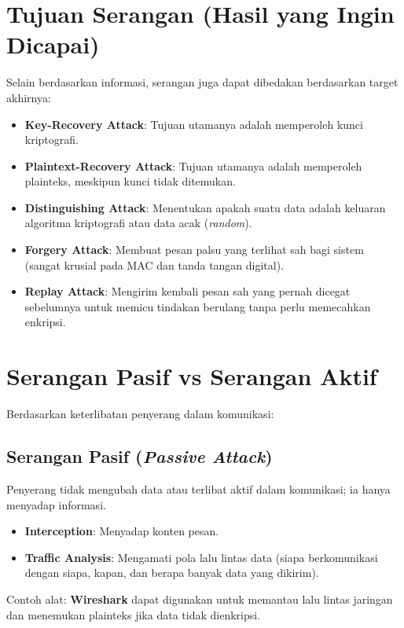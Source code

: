 \documentclass[../main.tex]{subfiles}
\begin{document}
\section{Tujuan Serangan (Hasil yang Ingin Dicapai)}
Selain berdasarkan informasi, serangan juga dapat dibedakan berdasarkan target akhirnya:
\begin{itemize}
    \item \textbf{Key-Recovery Attack}: Tujuan utamanya adalah memperoleh kunci kriptografi.
    \item \textbf{Plaintext-Recovery Attack}: Tujuan utamanya adalah memperoleh plainteks, meskipun kunci tidak ditemukan.
    \item \textbf{Distinguishing Attack}: Menentukan apakah suatu data adalah keluaran algoritma kriptografi atau data acak (\textit{random}).
    \item \textbf{Forgery Attack}: Membuat pesan palsu yang terlihat sah bagi sistem (sangat krusial pada MAC dan tanda tangan digital).
    \item \textbf{Replay Attack}: Mengirim kembali pesan sah yang pernah dicegat sebelumnya untuk memicu tindakan berulang tanpa perlu memecahkan enkripsi.
\end{itemize}

\section{Serangan Pasif vs Serangan Aktif}
Berdasarkan keterlibatan penyerang dalam komunikasi:

\subsection{Serangan Pasif (\textit{Passive Attack})}
Penyerang tidak mengubah data atau terlibat aktif dalam komunikasi; ia hanya menyadap informasi.
\begin{itemize}
    \item \textbf{Interception}: Menyadap konten pesan.
    \item \textbf{Traffic Analysis}: Mengamati pola lalu lintas data (siapa berkomunikasi dengan siapa, kapan, dan berapa banyak data yang dikirim).
\end{itemize}
Contoh alat: \textbf{Wireshark} dapat digunakan untuk memantau lalu lintas jaringan dan menemukan plainteks jika data tidak dienkripsi.
\end{document}
